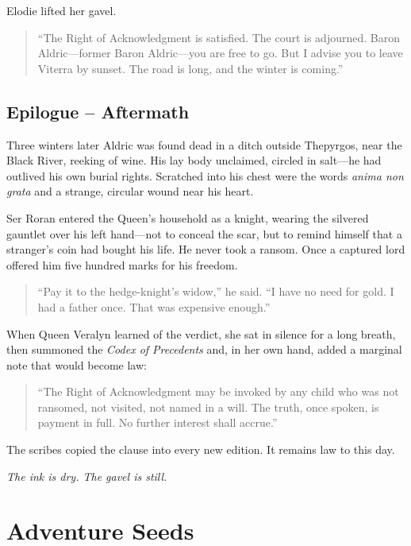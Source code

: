 \documentclass[11pt,twoside]{book}
\newcommand{\ornament}{\par\centering\adforn{36}\par}
\begin{document}
Elodie lifted her gavel.

\begin{quote}
``The Right of Acknowledgment is satisfied. The court is adjourned. Baron Aldric---former Baron Aldric---you are free to go. But I advise you to leave Viterra by sunset. The road is long, and the winter is coming.''
\end{quote}

\newpage

\section*{Epilogue -- Aftermath}

Three winters later Aldric was found dead in a ditch outside Thepyrgos, near the Black River, reeking of wine. His lay body unclaimed, circled in salt---he had outlived his own burial rights. Scratched into his chest were the words \textit{anima non grata} and a strange, circular wound near his heart.

Ser Roran entered the Queen's household as a knight, wearing the silvered gauntlet over his left hand---not to conceal the scar, but to remind himself that a stranger's coin had bought his life. He never took a ransom. Once a captured lord offered him five hundred marks for his freedom.

\begin{quote}
``Pay it to the hedge-knight's widow,'' he said. ``I have no need for gold. I had a father once. That was expensive enough.''
\end{quote}

When Queen Veralyn learned of the verdict, she sat in silence for a long breath, then summoned the \textit{Codex of Precedents} and, in her own hand, added a marginal note that would become law:

\begin{quote}
``The Right of Acknowledgment may be invoked by any child who was not ransomed, not visited, not named in a will. The truth, once spoken, is payment in full. No further interest shall accrue.''
\end{quote}

The scribes copied the clause into every new edition. It remains law to this day.

\noindent\textit{The ink is dry. The gavel is still.}

\ornament

\chapter{Adventure Seeds}
\end{document}
